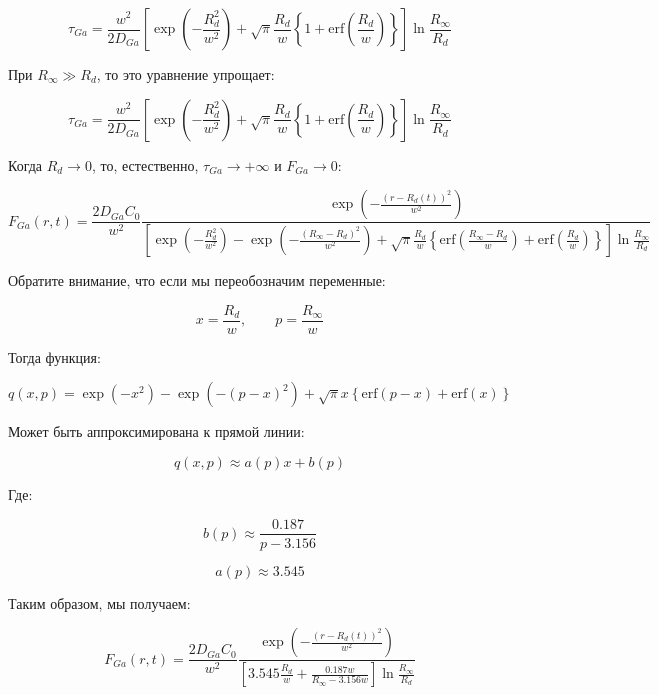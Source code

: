 \documentclass[14pt,oneside]{extarticle}
\begin{document}
\begin{equation}
\tau_{Ga}=\frac{w^{2}}{2D_{Ga}}\left[\exp\left(-\frac{R_{d}^{2}}{w^{2}}\right)+\sqrt{\pi}\frac{R_{d}}{w}\left\{ 1+\text{erf}\left(\frac{R_{d}}{w}\right)\right\} \right]\ln\frac{R_{\infty}}{R_{d}}
\end{equation}

При $R_{\infty}\gg R_{d}$, то это уравнение упрощает:

\begin{equation}
\tau_{Ga}=\frac{w^{2}}{2D_{Ga}}\left[\exp\left(-\frac{R_{d}^{2}}{w^{2}}\right)+\sqrt{\pi}\frac{R_{d}}{w}\left\{ 1+\text{erf}\left(\frac{R_{d}}{w}\right)\right\} \right]\ln\frac{R_{\infty}}{R_{d}}
\end{equation}

Когда $R_{d}\to0$, то, естественно, $\tau_{Ga}\to+\infty$ и $F_{Ga}\to0$:

\begin{equation}
F_{Ga}\left(r,t\right)=\frac{2D_{Ga}C_{0}}{w^{2}}\frac{\exp\left(-\frac{\left(r-R_{d}\left(t\right)\right)^{2}}{w^{2}}\right)}{\left[\exp\left(-\frac{R_{d}^{2}}{w^{2}}\right)-\exp\left(-\frac{\left(R_{\infty}-R_{d}\right)^{2}}{w^{2}}\right)+\sqrt{\pi}\frac{R_{d}}{w}\left\{ \text{erf}\left(\frac{R_{\infty}-R_{d}}{w}\right)+\text{erf}\left(\frac{R_{d}}{w}\right)\right\} \right]\ln\frac{R_{\infty}}{R_{d}}}
\end{equation}

Обратите внимание, что если мы переобозначим переменные:

\[
x=\frac{R_{d}}{w},\qquad p=\frac{R_{\infty}}{w}
\]

Тогда функция:

\[
q\left(x,p\right)=\exp\left(-x^{2}\right)-\exp\left(-\left(p-x\right)^{2}\right)+\sqrt{\pi}x\left\{ \text{erf}\left(p-x\right)+\text{erf}\left(x\right)\right\} 
\]

Может быть аппроксимирована к прямой линии:

\[
q\left(x,p\right)\approx a\left(p\right)x+b\left(p\right)
\]

Где:

\[
b\left(p\right)\approx\frac{0.187}{p-3.156}
\]

\[
a\left(p\right)\approx3.545
\]

Таким образом, мы получаем:

\begin{equation}
F_{Ga}\left(r,t\right)=\frac{2D_{Ga}C_{0}}{w^{2}}\frac{\exp\left(-\frac{\left(r-R_{d}\left(t\right)\right)^{2}}{w^{2}}\right)}{\left[3.545\frac{R_{d}}{w}+\frac{0.187w}{R_{\infty}-3.156w}\right]\ln\frac{R_{\infty}}{R_{d}}}
\end{equation}
\end{document}
